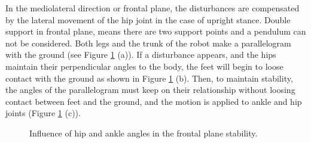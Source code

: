 In the mediolateral direction or frontal plane, the disturbances are compensated by the lateral movement of the hip joint in the case of upright stance. Double support in frontal plane, means there are two support points and a pendulum can not be considered. Both legs and the trunk of the robot make a parallelogram with the ground (see Figure \ref{fig:piernas} (a)). If a disturbance appears, and the hips maintain their perpendicular angles to the body, the feet will begin to loose contact with the ground as shown in Figure \ref{fig:piernas} (b). Then, to maintain stability, the angles of the parallelogram must keep on their relationship without loosing contact between feet and the ground, and the motion is applied to ankle and hip joints (Figure \ref{fig:piernas} (c)). 


\begin{figure}[!htbp]
\centering
{}
\caption{Influence of hip and ankle angles in the frontal plane stability.} \label{fig:piernas}
\end{figure}


